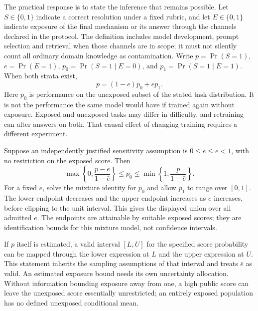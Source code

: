 The practical response is to state the inference that remains possible. Let
\(S\in\{0,1\}\) indicate a correct resolution under a fixed rubric, and let
\(E\in\{0,1\}\) indicate exposure of the final mechanism or its answer through
the channels declared in the protocol. The definition includes model
development, prompt selection and retrieval when those channels are in scope;
it must not silently count all ordinary domain knowledge as contamination.
Write \(p=\Pr(S=1)\), \(e=\Pr(E=1)\),
\(p_0=\Pr(S=1\mid E=0)\), and \(p_1=\Pr(S=1\mid E=1)\).
When both strata exist,
\[
 p=(1-e)p_0+ep_1.
\]
Here \(p_0\) is performance on the unexposed subset of the stated task
distribution. It is not the performance the same model would have if trained
again without exposure. Exposed and unexposed tasks may differ in difficulty,
and retraining can alter answers on both. That causal effect of changing
training requires a different experiment.

Suppose an independently justified sensitivity assumption is
\(0\leq e\leq\bar e<1\), with no restriction on the exposed score. Then
\[
 \max\!\left\{0,\frac{p-\bar e}{1-\bar e}\right\}
 \leq p_0\leq
 \min\!\left\{1,\frac{p}{1-\bar e}\right\}.
\]
For a fixed \(e\), solve the mixture identity for \(p_0\) and allow
\(p_1\) to range over \([0,1]\). The lower endpoint decreases and the upper
endpoint increases as \(e\) increases, before clipping to the unit interval.
This gives the displayed union over all admitted \(e\). The endpoints are
attainable by suitable exposed scores; they are identification bounds for
this mixture model, not confidence intervals.

If \(p\) itself is estimated, a valid interval \([L,U]\) for
the specified score probability can be mapped through the lower expression
at \(L\) and the upper expression at \(U\). This statement inherits the
sampling assumptions of that interval and treats \(\bar e\) as valid. An
estimated exposure bound needs its own uncertainty allocation. Without
information bounding exposure away from one, a high public score can leave
the unexposed score essentially unrestricted; an entirely exposed population
has no defined unexposed conditional mean.

